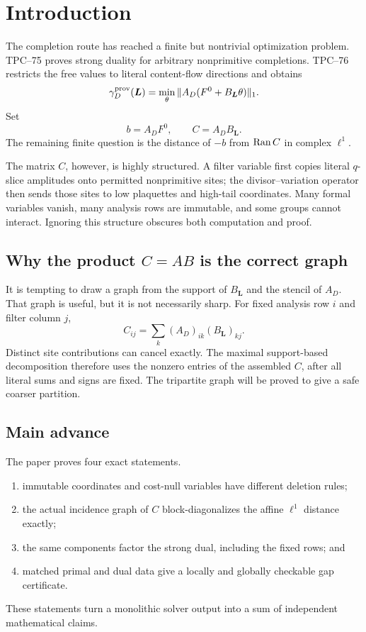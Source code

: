 \section{Introduction}
\label{sec:introduction}

The completion route has reached a finite but nontrivial optimization
problem. TPC--75 \citep{WangTPC75} proves strong duality for arbitrary
nonprimitive completions. TPC--76 \citep{WangTPC76} restricts the free
values to literal content-flow directions and obtains
\[
 \gamma_D^{\rm prov}(\boldsymbol L)
 =
 \min_\theta
 \|A_D(F^0+B_{\boldsymbol L}\theta)\|_1.
\]
Set
\[
 b=A_DF^0,\qquad C=A_DB_{\boldsymbol L}.
\]
The remaining finite question is the distance of \(-b\) from
\(\operatorname{Ran} C\) in complex \(\ell^1\).

The matrix \(C\), however, is highly structured. A filter variable first
copies literal \(q\)-slice amplitudes onto permitted nonprimitive sites;
the divisor--variation operator then sends those sites to low
plaquettes and high-tail coordinates. Many formal variables vanish,
many analysis rows are immutable, and some groups cannot interact.
Ignoring this structure obscures both computation and proof.

\subsection{Why the product \texorpdfstring{\(C=AB\)}{C=AB} is the correct graph}

It is tempting to draw a graph from the support of
\(B_{\boldsymbol L}\) and the stencil of \(A_D\). That graph is useful,
but it is not necessarily sharp. For fixed analysis row \(i\) and
filter column \(j\),
\[
 C_{ij}
 =
 \sum_k(A_D)_{ik}(B_{\boldsymbol L})_{kj}.
\]
Distinct site contributions can cancel exactly. The maximal
support-based decomposition therefore uses the nonzero entries of the
assembled \(C\), after all literal sums and signs are fixed. The
tripartite graph will be proved to give a safe coarser partition.

\subsection{Main advance}

The paper proves four exact statements.
\begin{enumerate}[label=\textup{(\roman*)},leftmargin=2.8em]
 \item immutable coordinates and cost-null variables have different
       deletion rules;
 \item the actual incidence graph of \(C\) block-diagonalizes the affine
       \(\ell^1\) distance exactly;
 \item the same components factor the strong dual, including the fixed
       rows; and
 \item matched primal and dual data give a locally and globally
       checkable gap certificate.
\end{enumerate}
These statements turn a monolithic solver output into a sum of
independent mathematical claims.

